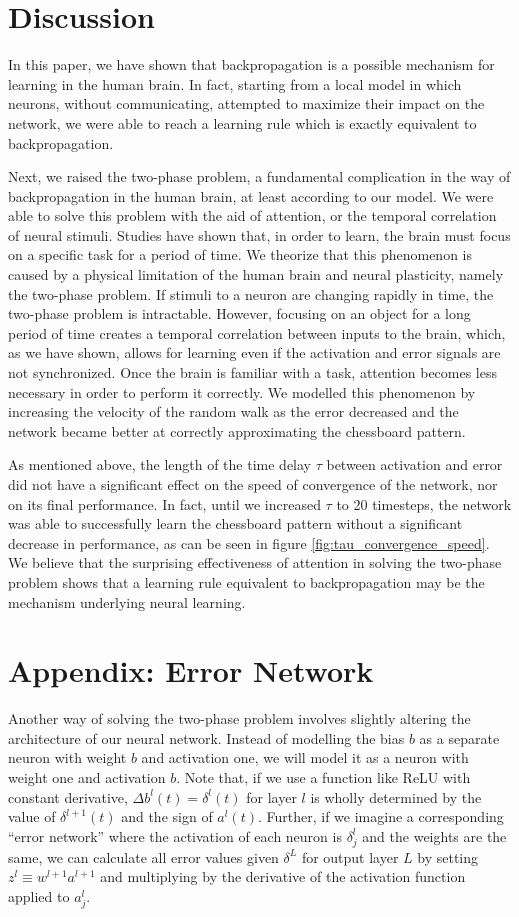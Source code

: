 \documentclass[12pt]{article}
\begin{document}
\section{Discussion}
In this paper, we have shown that backpropagation is a possible mechanism for learning in the human brain. In fact, starting from a local model in which neurons, without communicating, attempted to maximize their impact on the network, we were able to reach a learning rule which is exactly equivalent to backpropagation.

Next, we raised the two-phase problem, a fundamental complication in the way of backpropagation in the human brain, at least according to our model. We were able to solve this problem with the aid of attention, or the temporal correlation of neural stimuli. Studies have shown that, in order to learn, the brain must focus on a specific task for a period of time. \cite{Desimone2014} We theorize that this phenomenon is caused by a physical limitation of the human brain and neural plasticity, namely the two-phase problem. If stimuli to a neuron are changing rapidly in time, the two-phase problem is intractable. However, focusing on an object for a long period of time creates a temporal correlation between inputs to the brain, which, as we have shown, allows for learning even if the activation and error signals are not synchronized. Once the brain is familiar with a task, attention becomes less necessary in order to perform it correctly. We modelled this phenomenon by increasing the velocity of the random walk as the error decreased and the network became better at correctly approximating the chessboard pattern.

As mentioned above, the length of the time delay $\tau$ between activation and error did not have a significant effect on the speed of convergence of the network, nor on its final performance. In fact, until we increased $\tau$ to 20 timesteps, the network was able to successfully learn the chessboard pattern without a significant decrease in performance, as can be seen in figure \ref{fig:tau_convergence_speed}. We believe that the surprising effectiveness of attention in solving the two-phase problem shows that a learning rule equivalent to backpropagation may be the mechanism underlying neural learning.

\section{Appendix: Error Network}
Another way of solving the two-phase problem involves slightly altering the architecture of our neural network. Instead of modelling the bias $b$ as a separate neuron with weight $b$ and activation one, we will model it as a neuron with weight one and activation $b$. Note that, if we use a function like ReLU with constant derivative, $\Delta b^l(t) = \delta^l(t)$ for layer $l$ is wholly determined by the value of $\delta^{l+1}(t)$ and the sign of $a^l(t)$. Further, if we imagine a corresponding ``error network'' where the activation of each neuron is $\delta^l_j$ and the weights are the same, we can calculate all error values given $\delta^L$ for output layer $L$ by setting $z^l \equiv w^{l+1} a^{l+1}$ and multiplying by the derivative of the activation function applied to $a_j^l$.
 
\end{document}
